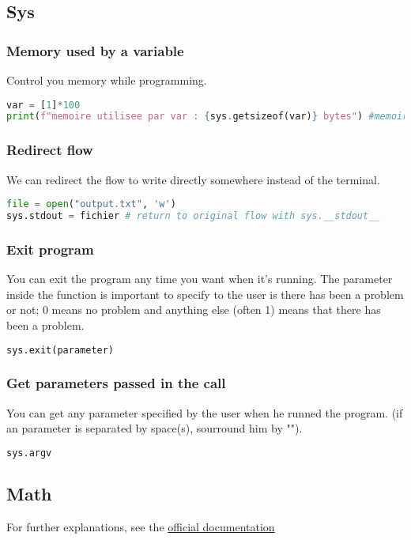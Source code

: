 \documentclass[a4paper, 12pt, titlepage]{scrartcl} %
\begin{document}
\subsection{Sys}
\subsubsection{Memory used by a variable}
Control you memory while programming. 
\begin{lstlisting}[language=Python]
var = [1]*100
print(f"memoire utilisee par var : {sys.getsizeof(var)} bytes") #memoire utilisee par var : 856 bytes
\end{lstlisting}

\subsubsection{Redirect flow}
We can redirect the flow to write directly somewhere instead of the terminal.
\begin{lstlisting}[language=Python]
file = open("output.txt", 'w')
sys.stdout = fichier # return to original flow with sys.__stdout__
\end{lstlisting}

\subsubsection{Exit program}
You can exit the program any time you want when it's running. The parameter inside the function is important to specify to the user is there has been a problem or not; 0 means no problem and anything else (often 1) means that there has been a problem.
\begin{lstlisting}[language=Python]
sys.exit(parameter)
\end{lstlisting}

\subsubsection{Get parameters passed in the call}
You can get any parameter specified by the user when he runned the program. (if an parameter is separated by space(s), sourround him by "").
\begin{lstlisting}[language=Python]
sys.argv
\end{lstlisting}

\subsection{Math}
For further explanations, see the \href{https://docs.python.org/3/library/math.html}{official documentation}
\end{document}
